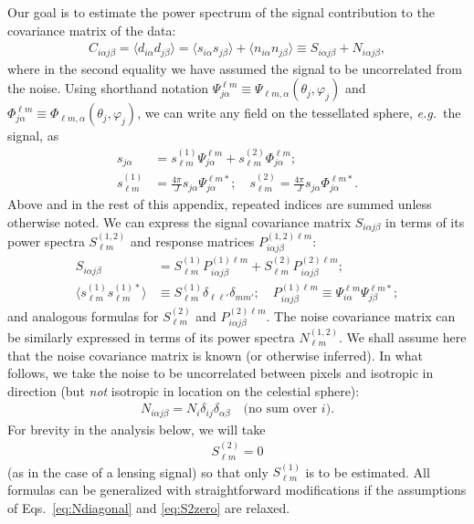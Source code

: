 \documentclass[prd,aps,twocolumn,nofootinbib,superscriptaddress,preprintnumbers,balancelastpage,longbibliography,floatfix]{revtex4-1}
\begin{document}
Our goal is to estimate the power spectrum of the signal contribution to the covariance matrix of the data:
\begin{align}
C_{i\alpha j \beta} = \langle d_{i \alpha} d_{j \beta} \rangle = \langle s_{i \alpha} s_{j \beta} \rangle + \langle n_{i \alpha} n_{j \beta} \rangle \equiv S_{i \alpha j \beta} + N_{i \alpha j \beta},
\end{align}
where in the second equality we have assumed the signal to be uncorrelated from the noise.
Using shorthand notation $\Psi^{\ell m}_{j \alpha} \equiv \Psi_{\ell m, \alpha}(\theta_j, \varphi_j)$ and $\Phi^{\ell m}_{j \alpha} \equiv \Phi_{\ell m, \alpha}(\theta_j, \varphi_j)$, we can write any field on the tessellated sphere, \emph{e.g.}~the signal, as
\begin{align}
s_{j\alpha} &=  s_{\ell m}^{(1)} \Psi^{\ell m}_{j \alpha} +  s_{\ell m}^{(2)} \Phi^{\ell m}_{j \alpha}; \\
s_{\ell m}^{(1)} &= \frac{4\pi}{J}  s_{j\alpha} \Psi^{\ell m *}_{j \alpha}; \quad s_{\ell m}^{(2)} = \frac{4\pi}{J} s_{j\alpha} \Phi^{\ell m *}_{j \alpha}.
\end{align}
Above and in the rest of this appendix, repeated indices are summed unless otherwise noted.
We can express the signal covariance matrix $S_{i\alpha j\beta}$ in terms of its power spectra $S^{(1,2)}_{\ell m}$ and response matrices $P^{(1,2)\ell m}_{i\alpha j \beta}$:
\begin{align}
S_{i \alpha j \beta} &=  S^{(1)}_{\ell m} P_{i \alpha j \beta}^{(1) \ell m } + S^{(2)}_{\ell m} P_{i \alpha j \beta}^{(2) \ell m }; \\
\langle s^{(1)}_{\ell m} s^{(1)*}_{\ell m} \rangle &\equiv S^{(1)}_{\ell m} \delta_{\ell \ell'} \delta_{m m'}; \quad P_{i \alpha j \beta}^{(1) \ell m } \equiv \Psi_{i \alpha}^{\ell m} \Psi_{j \beta}^{\ell m *}; \label{eq:Presponse}
\end{align}
and analogous formulas for $S^{(2)}_{\ell m}$ and $P^{(2)\ell m}_{i \alpha j \beta}$. The noise covariance matrix can be similarly expressed in terms of its power spectra $N^{(1,2)}_{\ell m}$. We shall assume here that the noise covariance matrix is known (or otherwise inferred). In what follows, we take the noise to be uncorrelated between pixels and isotropic in direction (but \emph{not} isotropic in location on the celestial sphere):
\begin{align}
N_{i \alpha j \beta} = N_i \delta_{ij} \delta_{\alpha \beta} \quad \text{(no sum over $i$)} \label{eq:Ndiagonal}.
\end{align}
For brevity in the analysis below, we will take 
\begin{align}
S^{(2)}_{\ell m} = 0 \label{eq:S2zero}
\end{align} 
(as in the case of a lensing signal) so that only $S^{(1)}_{\ell m}$ is to be estimated.
All formulas can be generalized with straightforward modifications if the assumptions of Eqs.~\eqref{eq:Ndiagonal} and \eqref{eq:S2zero} are relaxed.
\end{document}
